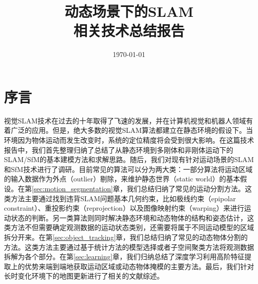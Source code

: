 \documentclass[11pt,a4paper,UTF8]{zhalabReport}
\title{\fontsize{40}{60}\selectfont 动态场景下的SLAM\\相关技术总结报告}
\date{\chdate\today}
\begin{document}

\maketitle

\tableofcontents
\section{序言}
\label{sec:preliminaries}
视觉SLAM技术在过去的十年取得了飞速的发展，并在计算机视觉和机器人领域有着广泛的应用。但是，绝大多数的视觉SLAM算法都建立在静态环境的假设下。当环境因为物体运动而发生改变时，系统的定位精度将会受到很大影响。在这篇技术报告中，我们首先整理归纳了总结了从静态环境到多刚体和非刚体运动下的SLAM/SfM的基本建模方法和求解思路。随后，我们对现有针对运动场景的SLAM和SfM技术进行了调研。目前常见的算法可以分为两大类：一部分算法将运动区域的输入数据作为外点（outlier）剔除，来维护静态世界（static world）的基本假设。在第\ref{sec:motion_segmentation}章，我们总结归纳了常见的运动分割方法。这类方法主要通过找到违背SLAM问题基本几何约束，比如极线约束（epipolar constraint）、重投影约束（reprojection）以及图像映射约束（warping）来进行运动状态的判断。另一类算法则同时解决静态环境和动态物体的结构和姿态估计，这类方法不但需要确定观测数据的运动状态类别，还需要将属于不同运动模型的区域拆分开来。在第\ref{sec:object_tracking}章，我们总结归纳了常见的动态物体分割的方法。这类方法主要通过基于统计方法的模型选择或者子空间聚类方法将观测数据拆解为各个部分。在第\ref{sec:learning}章，我们归纳总结了深度学习利用高阶特征提取上的优势来端到端地获取运动区域或动态物体掩模的主要方法。最后，我们针对长时变化环境下的地图更新进行了相关的文献综述。
%
%
%
%




	
\end{document}
